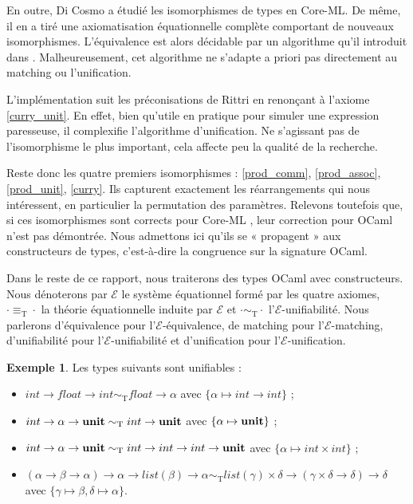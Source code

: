\documentclass[a4paper]{report}
\theoremstyle{definition}
\newtheorem{exemple}[theoreme]{Exemple}
\newcommand{\unit}{\bold{unit}}
\newcommand{\E}{\mathscr{E}}
\newcommand{\T}{\mathrm{T}}
\begin{document}
En outre, Di Cosmo \cite{DiCosmo92} a étudié les isomorphismes de types en Core-ML. De même, il en a tiré une axiomatisation équationnelle complète comportant de nouveaux isomorphismes. L'équivalence est alors décidable par un algorithme qu'il introduit dans \cite{DiCosmo95}. Malheureusement, cet algorithme ne s'adapte a priori pas directement au matching ou l'unification.

L'implémentation suit les préconisations de Rittri en renonçant à l'axiome \eqref{curry_unit}. En effet, bien qu'utile en pratique pour simuler une expression paresseuse, il complexifie l'algorithme d'unification. Ne s'agissant pas de l'isomorphisme le plus important, cela affecte peu la qualité de la recherche.

Reste donc les quatre premiers isomorphismes : \eqref{prod_comm}, \eqref{prod_assoc}, \eqref{prod_unit}, \eqref{curry}. Ils capturent exactement les réarrangements qui nous intéressent, en particulier la permutation des paramètres. Relevons toutefois que, si ces isomorphismes sont corrects pour Core-ML \cite{DiCosmo93}, leur correction pour OCaml n'est pas démontrée. Nous admettons ici qu'ils se « propagent » aux constructeurs de types, c'est-à-dire la congruence sur la signature OCaml.

Dans le reste de ce rapport, nous traiterons des types OCaml avec constructeurs. Nous dénoterons par $\E$ le système équationnel formé par les quatre axiomes, $\cdot \equiv_\T \cdot$ la théorie équationnelle induite par $\E$ et $\cdot \sim_\T \cdot$ l'$\E$-unifiabilité. Nous parlerons d'équivalence pour l'$\E$-équivalence, de matching pour l'$\E$-matching, d'unifiabilité pour l'$\E$-unifiabilité et d'unification pour l'$\E$-unification.

\begin{exemple}
  Les types suivants sont unifiables :
  \begin{itemize}
    \item $int \rightarrow float \rightarrow int \sim_\T float \rightarrow \alpha$ avec $\{ \alpha \mapsto int \rightarrow int \}$ ;
    \item $int \rightarrow \alpha \rightarrow \unit \sim_\T int \rightarrow \unit$ avec $\{ \alpha \mapsto \unit \}$ ;
    \item $int \rightarrow \alpha \rightarrow \unit \sim_\T int \rightarrow int \rightarrow int \rightarrow \unit$ avec $\{ \alpha \mapsto int \times int \}$ ;
    \item $(\alpha \rightarrow \beta \rightarrow \alpha) \rightarrow \alpha \rightarrow list (\beta) \rightarrow \alpha \sim_\T list (\gamma) \times \delta \rightarrow (\gamma \times \delta \rightarrow \delta) \rightarrow \delta$ \\ avec $\{ \gamma \mapsto \beta, \delta \mapsto \alpha \}$.
  \end{itemize}
\end{exemple}
\end{document}
